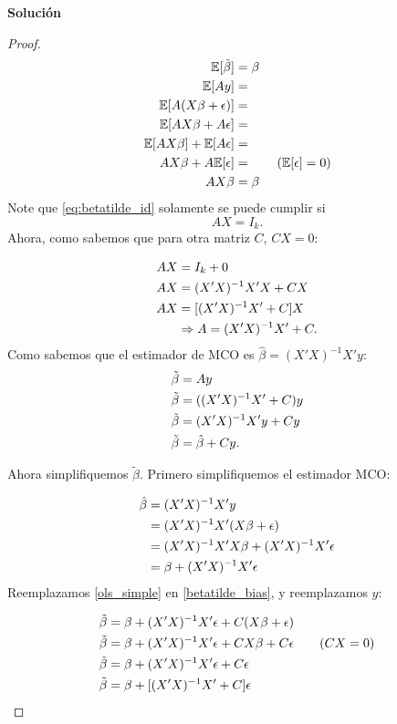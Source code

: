 \documentclass[a4paper, answers, addpoints, 11pt]{exam}
\newenvironment{solucion}{%
  \begin{mdframed}[
    backgroundcolor=blue!5,    %
    linecolor=blue!50,          %
    linewidth=2pt,              %
    leftmargin=10pt,            %
    rightmargin=10pt,           %
    topline=true,              %
    bottomline=true,            %
    roundcorner=10pt,           %
    innerleftmargin=10pt,       %
    innerrightmargin=10pt,      %
    innerbottommargin=10pt,     %
    innertopmargin=10pt         %
  ]%
  \begin{tcolorbox}[colframe=blue!50!black, colback=blue!50, coltitle=white, sharp corners=all, boxrule=1mm, width=\textwidth, halign=left, valign=center, top=0mm, bottom=0mm, left=0mm, right=0mm] \textbf{Solución} \end{tcolorbox} }{\end{mdframed}}
\begin{document}
\begin{enumerate}
\begin{itemize}
\begin{solucion}
\begin{proof}
    \begin{align}
        \mathbb{E}[\tilde{\beta}] &= \beta \notag \\
        \mathbb{E}[Ay] &= \notag \\
        \mathbb{E}[A(X\beta+\epsilon)] &= \notag \\ 
        \mathbb{E}[AX\beta+A\epsilon] &= \notag \\
        \mathbb{E}[AX\beta]+\mathbb{E}[A\epsilon] &= \notag \\
        AX\beta+A\mathbb{E}[\epsilon] &= \notag \qquad (\mathbb{E}[\epsilon]=0) \\
        AX\beta&=\beta \label{eq:betatilde_id}
    \end{align}
   Note que \ref{eq:betatilde_id} solamente se puede cumplir si 
   $$
   AX = I_k.
   $$
   Ahora, como sabemos que para otra matriz $C$, $CX=0$:

   \begin{align}
       AX &= I_k + 0 \notag \\
       AX &= (X'X)^{-1}X'X + CX \notag \\
       AX &= [(X'X)^{-1}X' + C]X \notag \\
       &\Rightarrow A=(X'X)^{-1}X'+C.  \label{betatilde_A}
   \end{align}
   Como sabemos que el estimador de MCO es $\hat{\beta}=(X'X)^{-1}X'y$:
   \begin{align}
       \tilde{\beta} &=Ay \notag \\
       \tilde{\beta} &=((X'X)^{-1}X'+C)y \notag \\
       \tilde{\beta} &=(X'X)^{-1}X'y+Cy \notag \\
       \tilde{\beta} &=\hat{\beta} +Cy \label{betatilde_bias}.
   \end{align}

   Ahora simplifiquemos $\tilde{\beta}$. Primero simplifiquemos el estimador MCO:

   \begin{align}
       \hat{\beta} &= (X'X)^{-1}X'y \notag \\
       &= (X'X)^{-1}X'(X\beta+\epsilon) \notag \\
       &= (X'X)^{-1}X'X\beta+(X'X)^{-1}X'\epsilon \notag \\
       &= \beta+(X'X)^{-1}X'\epsilon \label{ols_simple} 
   \end{align}
   Reemplazamos \ref{ols_simple} en \ref{betatilde_bias}, y reemplazamos $y$:

   \begin{align}
       \tilde{\beta} &= \beta+(X'X)^{-1}X'\epsilon +C(X\beta+\epsilon) \notag \\
       \tilde{\beta} &= \beta+(X'X)^{-1}X'\epsilon +CX\beta+C\epsilon \qquad (CX=0) \\
       \tilde{\beta} &= \beta+(X'X)^{-1}X'\epsilon+C\epsilon \notag \\
       \tilde{\beta} &= \beta+[(X'X)^{-1}X'+C]\epsilon  \label{betatilde_simple}
   \end{align}
   

\end{proof}
\end{solucion}
\end{itemize}
\end{enumerate}
\end{document}
